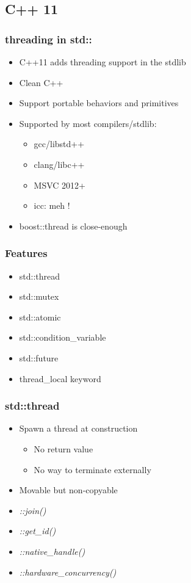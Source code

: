 \subsection{C++ 11}
\label{subsec:cpp11}

\begin{frame}
  \frametitle{threading in std::}

  \begin{itemize}
  \item C++11 adds threading support in the stdlib
  \item Clean C++
  \item Support portable behaviors and primitives
  \item Supported by most compilers/stdlib:
    \begin{itemize}
    \item gcc/libstd++
    \item clang/libc++
    \item MSVC 2012+
    \item icc: meh !
    \end{itemize}
  \item boost::thread is close-enough
  \end{itemize}
\end{frame}


\begin{frame}
  \frametitle{Features}

  \begin{itemize}
  \item std::thread
  \item std::mutex
  \item std::atomic
  \item std::condition\_variable
  \item std::future
  \item thread\_local keyword
  \end{itemize}
\end{frame}

\begin{frame}
  \frametitle{std::thread}

  \begin{itemize}
  \item Spawn a thread at construction
    \begin{itemize}
    \item No return value
    \item No way to terminate externally
    \end{itemize}
  \item Movable but non-copyable
  \item \emph{::join()}
  \item \emph{::get\_id()}
  \item \emph{::native\_handle()}
  \item \emph{::hardware\_concurrency()}
  \end{itemize}
\end{frame}


